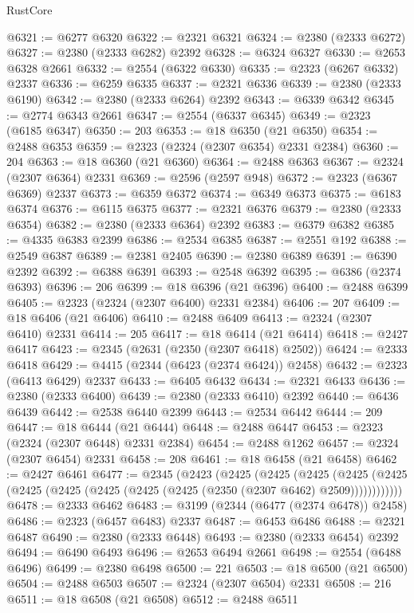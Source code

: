 \begin{lexlean}{RustCore}
\begin{coremodule}
@6321 := @6277 @6320
@6322 := @2321 @6321
@6324 := @2380 (@2333 @6272)
@6327 := @2380 (@2333 @6282) @2392
@6328 := @6324 @6327
@6330 := @2653 @6328 @2661
@6332 := @2554 (@6322 @6330)
@6335 := @2323 (@6267 @6332) @2337
@6336 := @6259 @6335
@6337 := @2321 @6336
@6339 := @2380 (@2333 @6190)
@6342 := @2380 (@2333 @6264) @2392
@6343 := @6339 @6342
@6345 := @2774 @6343 @2661
@6347 := @2554 (@6337 @6345)
@6349 := @2323 (@6185 @6347)
@6350 := 203
@6353 := @18 @6350 (@21 @6350)
@6354 := @2488 @6353
@6359 := @2323 (@2324 (@2307 @6354) @2331 @2384)
@6360 := 204
@6363 := @18 @6360 (@21 @6360)
@6364 := @2488 @6363
@6367 := @2324 (@2307 @6364) @2331
@6369 := @2596 (@2597 @948)
@6372 := @2323 (@6367 @6369) @2337
@6373 := @6359 @6372
@6374 := @6349 @6373
@6375 := @6183 @6374
@6376 := @6115 @6375
@6377 := @2321 @6376
@6379 := @2380 (@2333 @6354)
@6382 := @2380 (@2333 @6364) @2392
@6383 := @6379 @6382
@6385 := @4335 @6383 @2399
@6386 := @2534 @6385
@6387 := @2551 @192
@6388 := @2549 @6387
@6389 := @2381 @2405
@6390 := @2380 @6389
@6391 := @6390 @2392
@6392 := @6388 @6391
@6393 := @2548 @6392
@6395 := @6386 (@2374 @6393)
@6396 := 206
@6399 := @18 @6396 (@21 @6396)
@6400 := @2488 @6399
@6405 := @2323 (@2324 (@2307 @6400) @2331 @2384)
@6406 := 207
@6409 := @18 @6406 (@21 @6406)
@6410 := @2488 @6409
@6413 := @2324 (@2307 @6410) @2331
@6414 := 205
@6417 := @18 @6414 (@21 @6414)
@6418 := @2427 @6417
@6423 := @2345 (@2631 (@2350 (@2307 @6418) @2502))
@6424 := @2333 @6418
@6429 := @4415 (@2344 (@6423 (@2374 @6424)) @2458)
@6432 := @2323 (@6413 @6429) @2337
@6433 := @6405 @6432
@6434 := @2321 @6433
@6436 := @2380 (@2333 @6400)
@6439 := @2380 (@2333 @6410) @2392
@6440 := @6436 @6439
@6442 := @2538 @6440 @2399
@6443 := @2534 @6442
@6444 := 209
@6447 := @18 @6444 (@21 @6444)
@6448 := @2488 @6447
@6453 := @2323 (@2324 (@2307 @6448) @2331 @2384)
@6454 := @2488 @1262
@6457 := @2324 (@2307 @6454) @2331
@6458 := 208
@6461 := @18 @6458 (@21 @6458)
@6462 := @2427 @6461
@6477 := @2345
    (@2423
      (@2425
        (@2425
          (@2425
            (@2425 (@2425 (@2425 (@2425 (@2425 (@2425 (@2425 (@2350 (@2307 @6462) @2509))))))))))))
@6478 := @2333 @6462
@6483 := @3199 (@2344 (@6477 (@2374 @6478)) @2458)
@6486 := @2323 (@6457 @6483) @2337
@6487 := @6453 @6486
@6488 := @2321 @6487
@6490 := @2380 (@2333 @6448)
@6493 := @2380 (@2333 @6454) @2392
@6494 := @6490 @6493
@6496 := @2653 @6494 @2661
@6498 := @2554 (@6488 @6496)
@6499 := @2380 @6498
@6500 := 221
@6503 := @18 @6500 (@21 @6500)
@6504 := @2488 @6503
@6507 := @2324 (@2307 @6504) @2331
@6508 := 216
@6511 := @18 @6508 (@21 @6508)
@6512 := @2488 @6511

\end{coremodule}
\end{lexlean}
